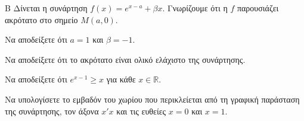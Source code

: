 \begin{thema}{Β}
Δίνεται η συνάρτηση $f(x) = e^{x-a} + \beta x$. Γνωρίζουμε ότι η $f$ παρουσιάζει ακρότατο στο σημείο $M(a, 0)$.
\begin{erwthma}
  \item Να αποδείξετε ότι $a=1$ και $\beta=-1$.
  \item Να αποδείξετε ότι το ακρότατο είναι ολικό ελάχιστο της συνάρτησης.
  \item Να αποδείξετε ότι $e^{x-1} \ge x$ για κάθε $x \in \mathbb{R}$.
  \item Να υπολογίσετε το εμβαδόν του χωρίου που περικλείεται από τη γραφική παράσταση της συνάρτησης, τον άξονα $x'x$ και τις ευθείες $x=0$ και $x=1$.
\end{erwthma}
\end{thema}
